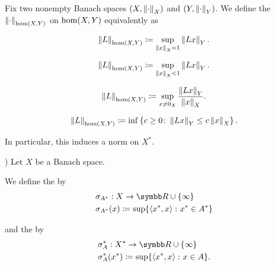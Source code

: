 \begin{Definition}\label{def:dual_norm}
  Fix two nonempty Banach spaces \( (X, \left\Vert \cdot \right\Vert_X) \) and \( (Y, \left\Vert \cdot \right\Vert_Y) \). We define the  \( \left\Vert \cdot \right\Vert_{\operatorname{hom}(X, Y)} \) on \( \operatorname{hom}(X, Y) \) equivalently as
  \begin{DefEnum}
    \begin{equation*}
      \left\Vert L \right\Vert_{\operatorname{hom}(X, Y)} \coloneqq \sup_{\left\Vert x \right\Vert_X = 1} \left\Vert Lx \right\Vert_Y.
    \end{equation*}

    \begin{equation*}
      \left\Vert L \right\Vert_{\operatorname{hom}(X, Y)} \coloneqq \sup_{\left\Vert x \right\Vert_X < 1} \left\Vert Lx \right\Vert_Y.
    \end{equation*}

    \begin{equation*}
      \left\Vert L \right\Vert_{\operatorname{hom}(X, Y)} \coloneqq \sup_{x \neq 0_X} \frac {\left\Vert Lx \right\Vert_Y} {\left\Vert x \right\Vert_X}.
    \end{equation*}

    \begin{equation*}
      \left\Vert L \right\Vert_{\operatorname{hom}(X, Y)} \coloneqq \inf \left\{ c \geq 0 \colon \left\Vert Lx \right\Vert_Y \leq c \left\Vert x \right\Vert_X \right\}.
    \end{equation*}
  \end{DefEnum}

  In particular, this induces a norm on \( X^* \).
\end{Definition}

\begin{Definition}\label{def:banach_space_support_function}\cite[example 3.2(a)]{Phelps1993})
  Let \( X \) be a Banach space.

  We define the  by
  \begin{align*}
    &\sigma_{A^*}: X \to \BR \cup \{ \infty \} \\
    &\sigma_{A^*}(x) \coloneqq \sup \{ \Prod {x^*} x \colon x^* \in A^* \}
  \end{align*}

  and the  by
  \begin{align*}
    &\sigma^*_A: X^* \to \BR \cup \{ \infty \} \\
    &\sigma^*_A(x^*) \coloneqq \sup \{ \Prod {x^*} x \colon x \in A \}.
  \end{align*}
\end{Definition}

